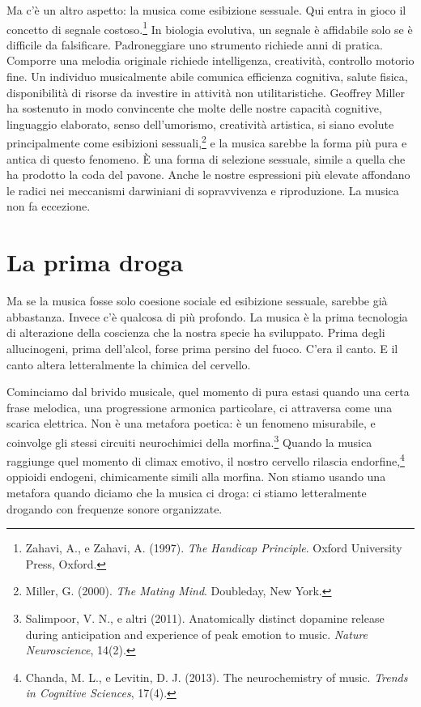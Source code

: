 Ma c'\`{e} un altro aspetto: la musica come esibizione sessuale. Qui entra in gioco il concetto di segnale costoso.\footnote{Zahavi, A., e Zahavi, A. (1997). \textit{The Handicap Principle}. Oxford University Press, Oxford.} In biologia evolutiva, un segnale \`{e} affidabile solo se \`{e} difficile da falsificare. Padroneggiare uno strumento richiede anni di pratica. Comporre una melodia originale richiede intelligenza, creativit\`{a}, controllo motorio fine. Un individuo musicalmente abile comunica efficienza cognitiva, salute fisica, disponibilit\`{a} di risorse da investire in attivit\`{a} non utilitaristiche. Geoffrey Miller ha sostenuto in modo convincente che molte delle nostre capacit\`{a} cognitive, linguaggio elaborato, senso dell'umorismo, creativit\`{a} artistica, si siano evolute principalmente come esibizioni sessuali,\footnote{Miller, G. (2000). \textit{The Mating Mind}. Doubleday, New York.} e la musica sarebbe la forma pi\`{u} pura e antica di questo fenomeno. \`{E} una forma di selezione sessuale, simile a quella che ha prodotto la coda del pavone. Anche le nostre espressioni pi\`{u} elevate affondano le radici nei meccanismi darwiniani di sopravvivenza e riproduzione. La musica non fa eccezione.

\section{La prima droga}

Ma se la musica fosse solo coesione sociale ed esibizione sessuale, sarebbe gi\`{a} abbastanza. Invece c'\`{e} qualcosa di pi\`{u} profondo. La musica \`{e} la prima tecnologia di alterazione della coscienza che la nostra specie ha sviluppato. Prima degli allucinogeni, prima dell'alcol, forse prima persino del fuoco. C'era il canto. E il canto altera letteralmente la chimica del cervello.

Cominciamo dal brivido musicale, quel momento di pura estasi quando una certa frase melodica, una progressione armonica particolare, ci attraversa come una scarica elettrica. Non \`{e} una metafora poetica: \`{e} un fenomeno misurabile, e coinvolge gli stessi circuiti neurochimici della morfina.\footnote{Salimpoor, V. N., e altri (2011). Anatomically distinct dopamine release during anticipation and experience of peak emotion to music. \textit{Nature Neuroscience}, 14(2).} Quando la musica raggiunge quel momento di climax emotivo, il nostro cervello rilascia endorfine,\footnote{Chanda, M. L., e Levitin, D. J. (2013). The neurochemistry of music. \textit{Trends in Cognitive Sciences}, 17(4).} oppioidi endogeni, chimicamente simili alla morfina. Non stiamo usando una metafora quando diciamo che la musica ci droga: ci stiamo letteralmente drogando con frequenze sonore organizzate.

